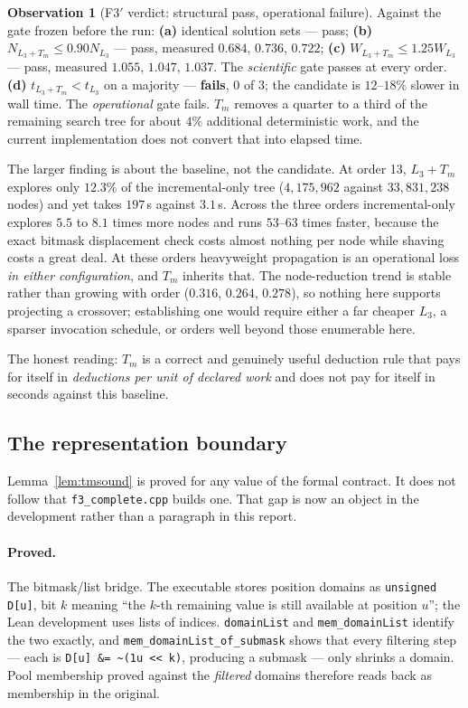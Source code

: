 \documentclass[11pt,a4paper]{article}
\theoremstyle{definition}
\newtheorem{observation}[theorem]{Observation}
\begin{document}
\begin{observation}[F3$'$ verdict: structural pass, operational failure]
\label{obs:f3prime}
Against the gate frozen before the run: \textbf{(a)} identical solution sets ---
pass; \textbf{(b)} $N_{L_3+T_m}\le0.90N_{L_3}$ --- pass, measured $0.684$,
$0.736$, $0.722$; \textbf{(c)} $W_{L_3+T_m}\le1.25W_{L_3}$ --- pass, measured
$1.055$, $1.047$, $1.037$. The \emph{scientific} gate passes at every order.
\textbf{(d)} $t_{L_3+T_m}<t_{L_3}$ on a majority --- \textbf{fails}, 0 of 3; the
candidate is $12$--$18\%$ slower in wall time. The \emph{operational} gate fails.
$T_m$ removes a quarter to a third of the remaining search tree for about $4\%$
additional deterministic work, and the current implementation does not convert
that into elapsed time.
\end{observation}

The larger finding is about the baseline, not the candidate. At order 13,
$L_3+T_m$ explores only $12.3\%$ of the incremental-only tree
($4{,}175{,}962$ against $33{,}831{,}238$ nodes) and yet takes $197$\,s against
$3.1$\,s. Across the three orders incremental-only explores $5.5$ to $8.1$ times
more nodes and runs $53$--$63$ times faster, because the exact bitmask displacement
check costs almost nothing per node while shaving costs a great deal. At these
orders heavyweight propagation is an operational loss \emph{in either
configuration}, and $T_m$ inherits that. The node-reduction trend is stable
rather than growing with order ($0.316$, $0.264$, $0.278$), so nothing here
supports projecting a crossover; establishing one would require either a far
cheaper $L_3$, a sparser invocation schedule, or orders well beyond those
enumerable here.

The honest reading: $T_m$ is a correct and genuinely useful deduction rule that
pays for itself in \emph{deductions per unit of declared work} and does not pay
for itself in seconds against this baseline.


\subsection{The representation boundary}
\label{sec:repboundary}

Lemma~\ref{lem:tmsound} is proved for any value of the formal contract. It does
not follow that \texttt{f3\_complete.cpp} builds one. That gap is now an object
in the development rather than a paragraph in this report.

\paragraph{Proved.} The bitmask/list bridge. The executable stores position
domains as \texttt{unsigned D[u]}, bit $k$ meaning ``the $k$-th remaining value is
still available at position $u$''; the Lean development uses lists of indices.
\texttt{domainList} and \texttt{mem\_domainList} identify the two exactly, and
\texttt{mem\_domainList\_of\_submask} shows that every filtering step --- each is
\texttt{D[u] \&= \~{}(1u <\!< k)}, producing a submask --- only shrinks a domain.
Pool membership proved against the \emph{filtered} domains therefore reads back
as membership in the original.
\end{document}
